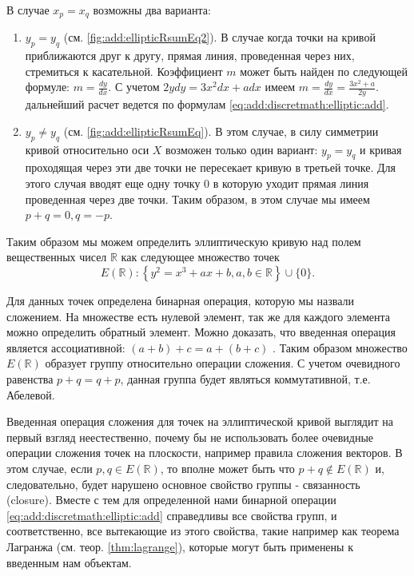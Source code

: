 В случае $x_p = x_q$ возможны два варианта:
\begin{enumerate}
\item $y_p = y_q$ (см. \autoref{fig:add:ellipticRsumEq2}). В случае
  когда точки на кривой приближаются друг к другу, прямая линия,
  проведенная через них, стремиться к касательной. Коэффициент $m$
  может быть найден по следующей формуле: $m = \frac{dy}{dx}$. С
  учетом $2ydy = 3x^2 dx + a dx$ имеем $m = \frac{dy}{dx} = \frac{3
    x^2 + a}{2y}$. дальнейший расчет ведется по формулам
  \eqref{eq:add:discretmath:elliptic:add}. 
\item $y_p \ne y_q$ (см. \autoref{fig:add:ellipticRsumEq}). В этом
  случае, в силу симметрии кривой относительно оси $X$ возможен только
  один вариант: $y_p = y_q$ и кривая проходящая через эти две точки не
  пересекает кривую в третьей точке. Для этого случая вводят еще одну
  точку $0$ в которую уходит прямая линия проведенная через две точки.
  Таким образом, в этом случае мы имеем $p + q = 0, q = -p$.
\end{enumerate}

Таким образом мы можем определить эллиптическую кривую над полем
вещественных чисел $\mathbb{R}$ как следующее множество точек
\begin{equation}
E\left(\mathbb{R}\right) : \left\{
y^2 = x^3 +ax +b, a,b \in \mathbb{R}
\right\} \cup \{0\}.
\label{eq:add:discretmath:elliptic:er}
\end{equation}

Для данных точек определена бинарная операция, которую мы назвали
сложением. На множестве есть нулевой элемент, так же для каждого
элемента можно определить обратный элемент. Можно доказать, что
введенная операция является ассоциативной: $(a+b) + c = a + (b+c)$
\cite{Washington:2008:ECN:1388394}. Таким образом множество
$E\left(\mathbb{R}\right)$ образует группу относительно операции
сложения. С учетом очевидного равенства $p + q = q + p$, данная группа
будет являться коммутативной, т.е. Абелевой. 

\begin{remark}
Введенная операция сложения для точек на эллиптической кривой выглядит
на первый взгляд неестественно, почему бы не использовать более
очевидные операции сложения точек на плоскости, например правила
сложения векторов. В этом случае, если $p,q \in
E\left(\mathbb{R}\right)$, то вполне может быть что $p + q \not\in
E\left(\mathbb{R}\right)$ и, следовательно, будет нарушено основное
свойство группы - связанность (closure). Вместе с тем для определенной
нами бинарной операции \eqref{eq:add:discretmath:elliptic:add}
справедливы все свойства групп, и соответственно, все вытекающие из
этого свойства, такие например как теорема Лагранжа (см. теор.
\ref{thm:lagrange}),  которые могут 
быть применены к введенным нам объектам.
\end{remark}


